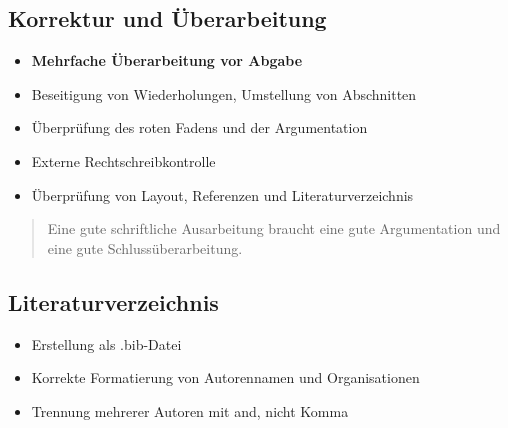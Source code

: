 \documentclass[12pt,a4paper,oneside]{article}
\begin{document}
\subsection{Korrektur und Überarbeitung}
\begin{itemize}
    \item \textbf{Mehrfache Überarbeitung vor Abgabe}
    \item Beseitigung von Wiederholungen, Umstellung von Abschnitten
    \item Überprüfung des roten Fadens und der Argumentation
    \item Externe Rechtschreibkontrolle
    \item Überprüfung von Layout, Referenzen und Literaturverzeichnis
\end{itemize}

\begin{quote}
\glqq Eine gute schriftliche Ausarbeitung braucht eine gute Argumentation und eine gute Schlussüberarbeitung.\grqq{}
\end{quote}

\subsection{Literaturverzeichnis}
\begin{itemize}
    \item Erstellung als .bib-Datei
    \item Korrekte Formatierung von Autorennamen und Organisationen
    \item Trennung mehrerer Autoren mit \glqq and\grqq{}, nicht Komma
\end{itemize}

\newpage
{} %
\printbibliography %
\end{document}
